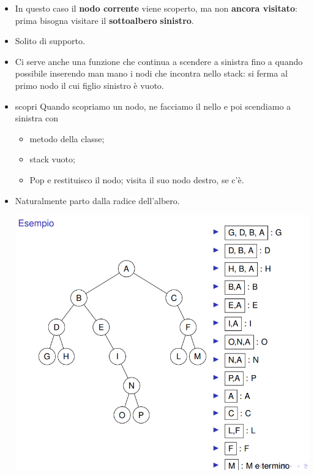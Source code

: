 \begin{itemize}
    \item  In questo caso il \textbf{nodo corrente} viene scoperto, ma non
   \textbf{ ancora visitato}: prima bisogna visitare il \textbf{sottoalbero}
    \textbf{sinistro}.
    \item Solito  di supporto.
    \item {} Ci serve anche una funzione che
    continua a scendere a sinistra fino a quando possibile
    inserendo man mano i nodi che incontra nello stack: si
    ferma al primo nodo il cui figlio sinistro è vuoto.
    \item scopri Quando scopriamo un nodo, ne facciamo il 
    nello  e poi scendiamo a sinistra con
    \begin{itemize}
        \item \textbf{\textcolor{blue}{}} metodo della classe;
        \item \textbf{\textcolor{blue}{}} stack vuoto;
        \item \textbf{\textcolor{blue}{}} Pop e restituisco il nodo; visita il suo nodo
        destro, se c’è.
    \end{itemize}
    \item Naturalmente parto dalla radice dell’albero.
    \begin{center}
        \includegraphics[scale = 0.6]{Capitoli/Iteratori/Esempi/Visita InOrder.png}
    \end{center}
\end{itemize}
